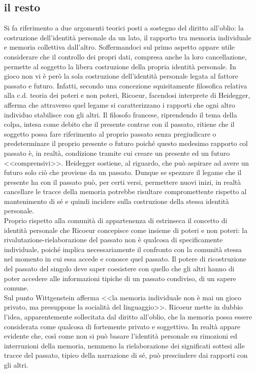 \subsection{il resto}
Si fa riferimento a due argomenti teorici posti a sostegno del diritto all'oblio: la costruzione dell'identità personale da un lato, il rapporto tra memoria individuale e memoria collettiva dall'altro.
Soffermandoci sul primo aspetto appare utile considerare che il controllo dei propri dati, compresa anche la loro cancellazione, permette al soggetto la libera costruzione della propria identità personale. In gioco non vi è però la sola costruzione dell'identità personale legata al fattore passato e futuro. Infatti, secondo una concezione squisitamente filosofica relativa alla c.d. teoria dei poteri e non poteri, Ricoeur, facendosi interprete di Heidegger, afferma che attraverso quel legame si caratterizzano i rapporti che ogni altro individuo stabilisce con gli altri.
Il filosofo francese, riprendendo il tema della colpa, intesa come debito che il presente contrae con il passato, ritiene che il soggetto possa fare riferimento al proprio passato senza pregiudicare o predeterminare il proprio presente o futuro poiché questo medesimo rapporto col passato è, in realtà, condizione tramite cui creare un presente ed un futuro <<comprensivi>>.
Heidegger sostiene, al riguardo, che può aspirare ad avere un futuro solo ciò che proviene da un passato. Dunque se spezzare il legame che il presente ha con il passato può, per certi versi, permettere nuovi inizi, in realtà cancellare le tracce della memoria potrebbe risultare compromettente rispetto al mantenimento di sé e quindi incidere sulla costruzione della stessa identità personale.
\\Proprio rispetto alla comunità di appartenenza di estrinseca il concetto di identità personale che Ricoeur concepisce come insieme di poteri e non poteri: la rivalutazione-rielaborazione del passato non è qualcosa di specificamente individuale, poiché implica necessariamente il confronto con la comunità stessa nel momento in cui essa accede e conosce quel passato. Il potere di ricostruzione del passato del singolo deve saper coesistere con quello che gli altri hanno di poter accedere alle informazioni tipiche di un passato condiviso, di un sapere comune.
\\Sul punto Wittgenstein afferma <<la memoria individuale non è mai un gioco privato, ma presuppone la socialità del linguaggio>>. Ricoeur mette in dubbio l'idea, apparentemente sollecitata dal diritto all'oblio, che la memoria possa essere considerata come qualcosa di fortemente privato e soggettivo. In realtà appare evidente che, così come non si può basare l'identità personale su rimozioni ed interruzioni della memoria, nemmeno la rielaborazione dei significati sottesi alle tracce del passato, tipico della narrazione di sé, può prescindere dai rapporti con gli altri.
